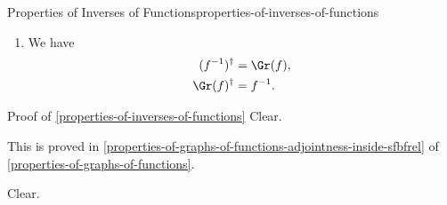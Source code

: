 \begin{proposition}{Properties of Inverses of Functions}{properties-of-inverses-of-functions}
\begin{enumerate}
            in $\sfbfRel$.
        \item\label{properties-of-inverses-of-functions-interaction-with-inverses-of-relations}We have
            \begin{align*}
                (f^{-1})^{\dagger} &= \Gr(f),\\
                \Gr(f)^{\dagger}   &= f^{-1}.
            \end{align*}
    \end{enumerate}
\end{proposition}
\begin{Proof}{Proof of \cref{properties-of-inverses-of-functions}}%
    Clear.

    This is proved in \cref{properties-of-graphs-of-functions-adjointness-inside-sfbfrel} of \cref{properties-of-graphs-of-functions}.

    Clear.
\end{Proof}
